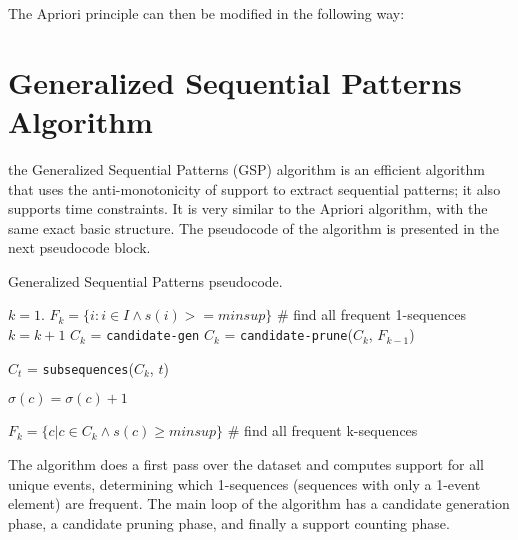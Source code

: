 The Apriori principle can then be modified in the following way:

\section{Generalized Sequential Patterns Algorithm}

the Generalized Sequential Patterns (GSP) algorithm is an efficient algorithm that uses the anti-monotonicity of support to extract sequential patterns; it also supports time constraints. It is very similar to the Apriori algorithm, with the same exact basic structure. The pseudocode of the algorithm is presented in the next pseudocode block.

\begin{algorithm}
\caption{Generalized Sequential Patterns pseudocode.}
\begin{algorithmic}[1]
    \State $k=1$.
    \State $F_k = \{ i : i \in I \land s(i) >= minsup \}$ \# find all frequent 1-sequences
    \Repeat
        \State $k = k + 1$
        \State $C_k$ = \texttt{candidate-gen}
        \State $C_k$ = \texttt{candidate-prune}($C_k$, $F_{k-1}$)

            \State $C_t$ = \texttt{subsequences}($C_k$, $t$)

                \State $\sigma(c) = \sigma(c) + 1$
            \EndFor
        \EndFor

        \State $F_k = \{ c | c \in C_k \land s(c) \geq minsup \}$ \# find all frequent k-sequences
\end{algorithmic}
\end{algorithm}
The algorithm does a first pass over the dataset and computes support for all unique events, determining which 1-sequences (sequences with only a 1-event element) are frequent. The main loop of the algorithm has a candidate generation phase, a candidate pruning phase, and finally a support counting phase.

